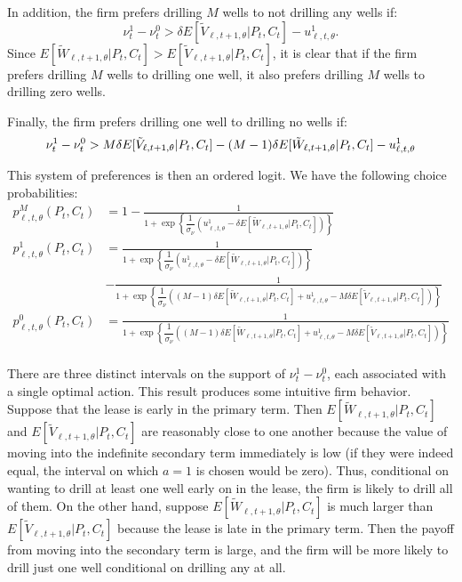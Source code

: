 \documentclass[12pt]{article}
\begin{document}
\noindent In addition, the firm prefers drilling  $M$ wells to not drilling any wells if:
\begin{equation}
\nu^1_t - \nu^0_t > \delta E[\tilde{V}_{\ell,t+1,\theta}|P_t,C_t] - u^1_{\ell,t,\theta}.
\end{equation}
\noindent Since $E[\tilde{W}_{\ell,t+1,\theta}|P_t,C_t] > E[\tilde{V}_{\ell,t+1,\theta}|P_t,C_t]$, it is clear that if the firm prefers drilling $M$ wells to drilling one well, it also prefers drilling $M$ wells to drilling zero wells.

Finally, the firm prefers drilling one well to drilling no wells if:
\begin{equation}
\nu^1_t - \nu^0_t > M \delta E[\tilde{V}_{\ell,t+1,\theta}|P_t,C_t] - (M - 1) \delta E[\tilde{W}_{\ell,t+1,\theta}|P_t,C_t] - u^1_{\ell,t,\theta} \\
\end{equation}

This system of preferences is then an ordered logit. We have the following choice probabilities:
\begin{equation}
\begin{aligned}
p^M_{\ell,t,\theta}(P_t,C_t) &= 1 - \frac{1}{1 + \exp\left\{ \dfrac{1}{\sigma_\nu} \left(  u^1_{\ell,t,\theta} - \delta E[\tilde{W}_{\ell,t+1,\theta}|P_t,C_t] \right) \right\} } \\
p^1_{\ell,t,\theta}(P_t,C_t) &= \frac{1}{1 + \exp\left\{ \dfrac{1}{\sigma_\nu} \left( u^1_{\ell,t,\theta} - \delta E[\tilde{W}_{\ell,t+1,\theta}|P_t,C_t]\right) \right\}} \\
& - \frac{1}{1 + \exp\left\{ \dfrac{1}{\sigma_\nu} \left( (M - 1) \delta E[\tilde{W}_{\ell,t+1,\theta}|P_t,C_t] + u^1_{\ell,t,\theta} - M \delta E[\tilde{V}_{\ell,t+1,\theta}|P_t,C_t]\right) \right\}} \\
p^0_{\ell,t,\theta}(P_t,C_t) &= \frac{1}{1 + \exp\left\{ \dfrac{1}{\sigma_\nu} \left(  (M - 1) \delta E[\tilde{W}_{\ell,t+1,\theta}|P_t,C_t] + u^1_{\ell,t,\theta} - M \delta E[\tilde{V}_{\ell,t+1,\theta}|P_t,C_t]\right) \right\} }\\
\end{aligned}
\end{equation}

There are three distinct intervals on the support of $\nu^1_t - \nu^0_t$, each associated with a single optimal action. This result produces some intuitive firm behavior. Suppose that the lease is early in the primary term.  Then $E[\tilde{W}_{\ell,t+1,\theta}|P_t,C_t]$ and $E[\tilde{V}_{\ell,t+1,\theta}|P_t,C_t]$ are reasonably close to one another because the value of moving into the indefinite secondary term immediately is low (if they were indeed equal, the interval on which $a=1$ is chosen would be zero). Thus, conditional on wanting to drill at least one well early on in the lease, the firm is likely to drill all of them. On the other hand, suppose $E[\tilde{W}_{\ell,t+1,\theta}|P_t,C_t]$ is much larger than $E[\tilde{V}_{\ell,t+1,\theta}|P_t,C_t]$ because the lease is late in the primary term. Then the payoff from moving into the secondary term is large, and the firm will be more likely to drill just one well conditional on drilling any at all.
\end{document}
